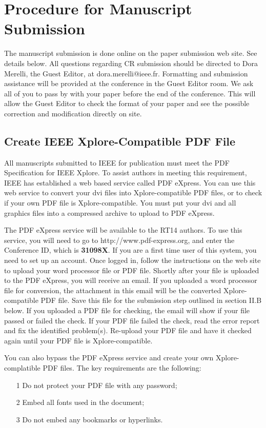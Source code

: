 \documentclass[journal]{IEEEtran}
\begin{document}
\section{Procedure for Manuscript Submission}

The manuscript submission is done online on the paper submission web site.  See details below. All questions regarding CR submission should be directed to Dora Merelli, the Guest Editor, at dora.merelli@ieee.fr. Formatting and submission assistance will be provided at the conference in the Guest Editor room. We ask all of you to pass by with your paper before the end of the conference. This will allow the Guest Editor to check the format of your paper and see the possible correction and modification directly on site.

\subsection{Create IEEE Xplore-Compatible PDF File}

All manuscripts submitted to IEEE for publication must meet the PDF Specification for IEEE Xplore\cite{IEEEPDFRequirement401}. To assist authors in meeting this requirement, IEEE has established a web based service called PDF eXpress. You can use this web service to convert your dvi  files into Xplore-compatible PDF files, or to check if your own PDF file is Xplore-compatible. You must put your dvi and all graphics files into a compressed archive to upload to PDF eXpress.

The PDF eXpress service will be available to the RT14 authors. To use this service, you will need to go to http://www.pdf-express.org, and enter the Conference ID, which is \textbf{31098X}. If you are a first time user of this system, you need to set up an account.  Once logged in, follow the instructions on the web site to upload your word processor file or PDF file.  Shortly after your file is uploaded to the PDF eXpress, you will receive an email. If you uploaded a word processor file for conversion, the attachment in this email will be the converted Xplore-compatible PDF file.  Save this file for the submission step outlined in section II.B below.  If you uploaded a PDF file for checking, the email will show if your file passed or failed the check.  If your PDF file failed the check, read the error report and fix the identified problem(s).  Re-upload your PDF file and have it checked again until your PDF file is Xplore-compatible.

You can also bypass the PDF eXpress service and create your own Xplore-complatible PDF files.  The key requirements are the following:
\begin{itemize}
\item[1]	Do not protect your PDF file with any password;
\item[2]	Embed all fonts used in the document;
\item[3]	Do not embed any bookmarks or hyperlinks.
\end{itemize}
\end{document}
